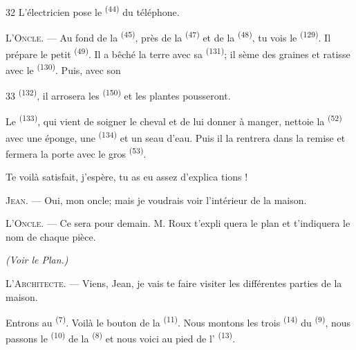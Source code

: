 \begin{VUpage}[34]{32}
\VUblancAlinea
L'électricien pose le  \textsuperscript{(44)} du téléphone.

\VUblancAlinea
\textsc{L'Oncle}. --- Au fond de la  \textsuperscript{(45)}, près de la\nl
{} \textsuperscript{(47)} et de la  \textsuperscript{(48)}, tu vois le \cc
{} \textsuperscript{(129)}. Il prépare le petit  \textsuperscript{(49)}. Il a bêché\nl
la terre avec sa  \textsuperscript{(131)}; il sème des graines et\nl
ratisse avec le  \textsuperscript{(130)}. Puis, avec son \cc
\parplein
\end{VUpage}

\begin{VUpage}[35]{33}
\VUcontinue
{} \textsuperscript{(132)}, il arrosera les  \textsuperscript{(150)} et les\nl
plantes pousseront.

\VUblancAlinea
Le  \textsuperscript{(133)}, qui vient de soigner le\nl
cheval et de lui donner à manger, nettoie la  \textsuperscript{(52)}\nl
avec une éponge, une  \textsuperscript{(134)} et un seau\nl
d'eau. Puis il la rentrera dans la remise et fermera\nl
la porte avec le gros  \textsuperscript{(53)}.

\VUblancAlinea
Te voilà satisfait, j'espère, tu as eu assez d'explica\cc
tions !

\VUblancAlinea
\textsc{Jean}. --- Oui, mon oncle; mais je voudrais voir\nl
l'intérieur de la maison.

\VUblancAlinea
\textsc{L'Oncle}. --- Ce sera pour demain. M. Roux t'expli\cc
quera le plan et t'indiquera le nom de chaque pièce.

\VUsaut{3.0mm}
\VUsaut{2.4mm}

{\centering\textit{(Voir le Plan.)}\par}
\VUsaut{2.4mm}

\VUblancAlinea
\textsc{L'Architecte}. --- Viens, Jean, je vais te faire\nl
visiter les différentes parties de la maison.

\VUblancAlinea
Entrons au  \textsuperscript{(7)}. Voilà le bouton\nl
de la  \textsuperscript{(11)}. Nous montons les trois \cc
{} \textsuperscript{(14)} du  \textsuperscript{(9)}, nous passons le  \textsuperscript{(10)} de\nl
la  \textsuperscript{(8)} et nous voici au pied de l'\cc
{} \textsuperscript{(13)}.


\end{VUpage}
